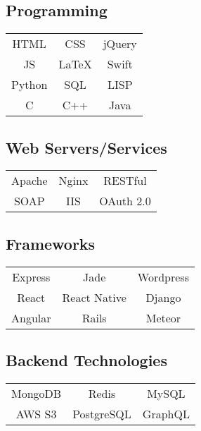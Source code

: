 \documentclass[letterpaper]{deedy-resume} %
\begin{document}
\begin{minipage}[t]{0.33\textwidth}
  \subsection{Programming}

  \begin{tabular}{ c c c }
    HTML    & CSS    & jQuery \\
    JS      & \LaTeX & Swift    \\
    Python & SQL    & LISP   \\
    C       & C++    & Java \\
  \end{tabular}

  \vspace{4mm}

  \subsection{Web Servers/Services}

  \begin{tabular}{ c c c }
    Apache & Nginx & RESTful \\
    SOAP & IIS & OAuth 2.0
  \end{tabular}

  \vspace{4mm}

  \subsection{Frameworks}

  \begin{tabular}{ c c c }
    Express & Jade & Wordpress \\
    React & React Native & Django \\
    Angular & Rails & Meteor
  \end{tabular}

  \vspace{4mm}

  \subsection{Backend Technologies}

  \begin{tabular}{ c c c }
    MongoDB & Redis & MySQL \\
    AWS S3 & PostgreSQL & GraphQL
  \end{tabular}

  \vspace{4mm}


\end{minipage}
\end{document}
